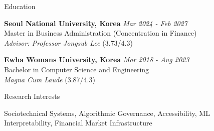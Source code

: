\documentclass{resume} %
\begin{document}

\begin{rSection}{Education}

{\bf Seoul National University, Korea} \hfill {\em Mar 2024 - Feb 2027}
\\{ Master in Business Administration (Concentration in Finance)} \hfill
\\ { \textit{Advisor: Professor Jongsub Lee} (3.73/4.3)}

{\bf Ewha Womans University, Korea} \hfill {\em Mar 2018 - Aug 2023}
\\ {Bachelor in Computer Science and Engineering}
\\ { \textit{Magna Cum Laude} (3.87/4.3)}

\end{rSection}


\begin{rSection}{Research Interests}

    Sociotechnical Systems, Algorithmic Governance, Accessibility, ML Interpretability, Financial Market Infrastructure

\end{rSection}


\end{document}
